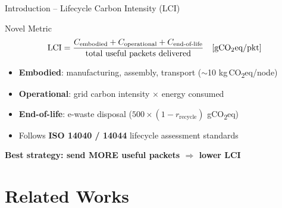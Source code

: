 \documentclass[aspectratio=169, 11pt]{beamer}
\newcommand{\CO}{CO\textsubscript{2}}
\begin{document}
\begin{frame}{Introduction -- Lifecycle Carbon Intensity (LCI)}
\begin{block}{Novel Metric}
\[
\text{LCI} = \frac{C_{\text{embodied}} + C_{\text{operational}} + C_{\text{end-of-life}}}{\text{total useful packets delivered}} \quad [\text{g\CO eq/pkt}]
\]
\end{block}

\vspace{3mm}
\begin{itemize}
    \item \textbf{Embodied}: manufacturing, assembly, transport ($\sim$10 kg\,\CO eq/node)
    \item \textbf{Operational}: grid carbon intensity $\times$ energy consumed
    \item \textbf{End-of-life}: e-waste disposal ($500 \times (1 - r_{\text{recycle}})$ g\CO eq)
    \item Follows \textbf{ISO 14040 / 14044} lifecycle assessment standards
\end{itemize}

\vspace{3mm}
\centering
\textcolor{calash}{\textbf{Best strategy: send MORE useful packets $\Rightarrow$ lower LCI}}
\end{frame}

\section{Related Works}
\end{document}
